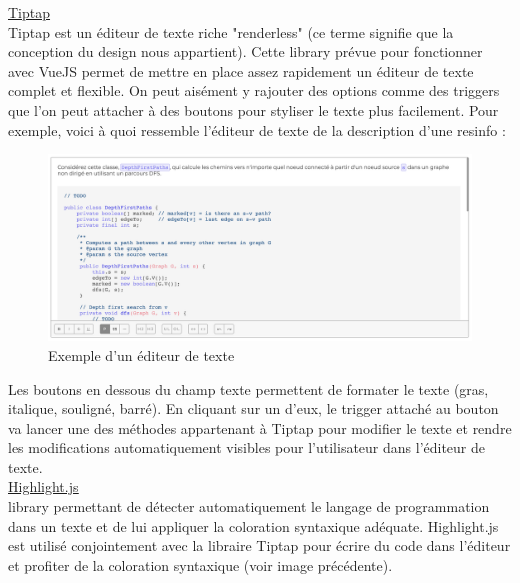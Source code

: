 \pagebreak
\noindent\underline{\href{https://tiptap.scrumpy.io}{Tiptap}}\\

Tiptap est un éditeur de texte riche "renderless" (ce terme signifie que la conception du design nous appartient). Cette \gls{library} prévue pour fonctionner avec VueJS permet de mettre en place assez rapidement un éditeur de texte complet et flexible. On peut aisément y rajouter des options comme des triggers que l'on peut attacher à des boutons pour styliser le texte plus facilement. Pour exemple, voici à quoi ressemble l'éditeur de texte de la description d'une \gls{resinfo} :\\

\begin{figure}[H]
    \includegraphics[width=\textwidth,height=0.35\textheight,keepaspectratio]{images/libraries/tiptap.png}
    \centering
    \caption[Tiptap : Exemple d'utilisation]{Exemple d'un éditeur de texte}
\end{figure}

Les boutons en dessous du champ texte permettent de formater le texte (gras, italique, souligné, barré). En cliquant sur un d'eux, le trigger attaché au bouton va lancer une des méthodes appartenant à Tiptap pour modifier le texte et rendre les modifications automatiquement visibles pour l'utilisateur dans l'éditeur de texte.\\

\noindent\underline{\href{https://highlightjs.org}{Highlight.js}}\\

\Gls{library} permettant de détecter automatiquement le langage de programmation dans un texte et de lui appliquer la coloration syntaxique adéquate. Highlight.js est utilisé conjointement avec la libraire Tiptap pour écrire du code dans l'éditeur et profiter de la coloration syntaxique (voir image précédente).\\

